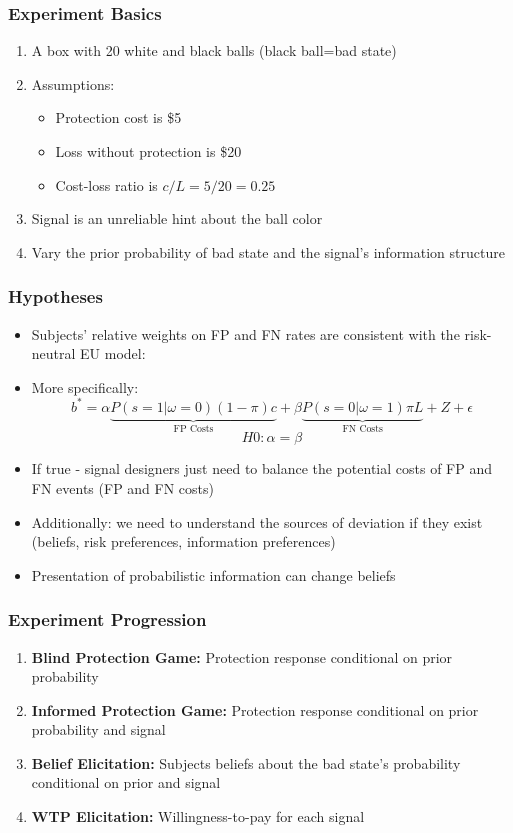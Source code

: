 \documentclass[11pt,hyperref={bookmarks=false}]{beamer}
\begin{document}
\begin{frame}
\frametitle{Experiment Basics}
\begin{enumerate}
\item A box with 20 white and black balls (black ball=bad state)
\item Assumptions:
\begin{itemize}
\item Protection cost is \$5
\item Loss without protection is \$20
\item Cost-loss ratio is $c/L=5/20=0.25$
\end{itemize}
\item Signal is an unreliable hint about the ball color
\item Vary the prior probability of bad state and the signal's information structure
\end{enumerate}
\end{frame}

\begin{frame}
\frametitle{Hypotheses}
\begin{itemize}
        \item Subjects' relative weights on FP and FN rates are consistent with the risk-neutral EU model:
       \item More specifically:
       $$b^*=\alpha \underbrace{P(s=1|\omega=0)(1-\pi)c}_{ \textrm{FP Costs} } +\beta \underbrace{P(s=0|\omega=1) \pi L}_{ \textrm{FN Costs} } + Z+\epsilon$$
       $$ H0:\alpha=\beta$$
       \item If true - signal designers just need to balance the potential costs of FP and FN events (FP and FN costs)
       \item Additionally: we need to understand the sources of deviation if they exist (beliefs, risk preferences, information preferences)
       \item Presentation of probabilistic information can change beliefs
\end{itemize}
\end{frame}


\begin{frame}
\frametitle{Experiment Progression}
\begin{enumerate}
\item \textbf{Blind Protection Game:} Protection response conditional on prior probability
\item \textbf{Informed Protection Game:} Protection response conditional on prior probability and signal
\item \textbf{Belief Elicitation:} Subjects beliefs about the bad state's probability conditional on prior and signal
\item \textbf{WTP Elicitation:} Willingness-to-pay for each signal
\end{enumerate}
\end{frame}
\end{document}
